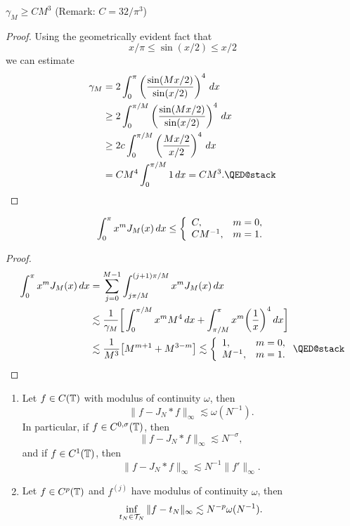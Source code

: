 \begin{lemma}
  $\gamma_M \geq C M^3$ (Remark: $C = 32/\pi^3$)
\end{lemma}
\begin{proof}
  Using the geometrically evident fact that
  \[
    x/\pi \leq \sin(x/2) \leq x/2
  \]
  we can estimate
  \begin{align*}
    \gamma_M
    &= 2 \int_0^\pi  \left( \frac{\sin( Mx/2)}{\sin(x/2)} \right)^4 \, dx  \\
    &\geq 2 \int_0^{\pi/M} \left( \frac{\sin( Mx/2)}{\sin(x/2)} \right)^4 \, dx \\
    &\geq 2c \int_0^{\pi/M} \left( \frac{Mx/2}{x/2} \right)^4 \, dx \\
    &= C M^4 \int_0^{\pi/M} 1 \,dx = C M^3. \qedhere
  \end{align*}
\end{proof}

\begin{lemma} \label{th:trig:jackson_moments}
  \[
    \int_0^\pi x^m J_M(x) \,dx \leq
      \left\{ \begin{array}{ll} C, & m = 0, \\
            C M^{-1}, & m = 1.
           \end{array} \right.
  \]
\end{lemma}
\begin{proof}
  \begin{align*}
    \int_0^\pi x^m J_M(x) \, dx
    &= \sum_{j = 0}^{M-1} \int_{j\pi/M}^{(j+1)\pi/M} x^m J_M(x) \, dx \\
    &\lesssim
        \frac{1}{\gamma_M} \bg[ \int_0^{\pi/M} x^m M^4 \, dx
        + \int_{\pi/M}^{\pi}
             x^m \bg( \frac{1}{x} \bg)^4 \, dx \bg] \\
    &\lesssim
      \frac{1}{M^3} \b[ M^{m+1} + M^{3-m} \b]
    \lesssim
      \cases{
        1, & m = 0, \\
        M^{-1}, & m = 1.
      }
      \qedhere
  \end{align*}
\end{proof}


\begin{theorem} \label{th:trig:jackson}
  \begin{enumerate}
  \item Let $f \in C(\mathbb{T})$ with modulus of continuity $\omega$, then
  \[
      \| f - J_N \ast f \|_\infty \lesssim \omega(N^{-1}).
  \]
  In particular, if $f \in C^{0,\sigma}(\mathbb{T})$, then
  \[
      \|f - J_N \ast f \|_\infty \lesssim N^{-\sigma},
  \]
  and if $f \in C^1(\mathbb{T})$, then
  \begin{equation} \label{eq:trig:jackson:C1-version}
    \|f - J_N \ast f \|_\infty \lesssim N^{-1} \|f'\|_\infty.
  \end{equation}
  \item Let $f \in C^p(\mathbb{T})$ and $f^{(j)}$ have modulus of continuity $\omega$,
  then
  \[
      \inf_{t_N \in \mathcal{T}_N} \| f - t_N \|_\infty \lesssim N^{-p} \omega(N^{-1}).
  \]
  \end{enumerate}
\end{theorem}

